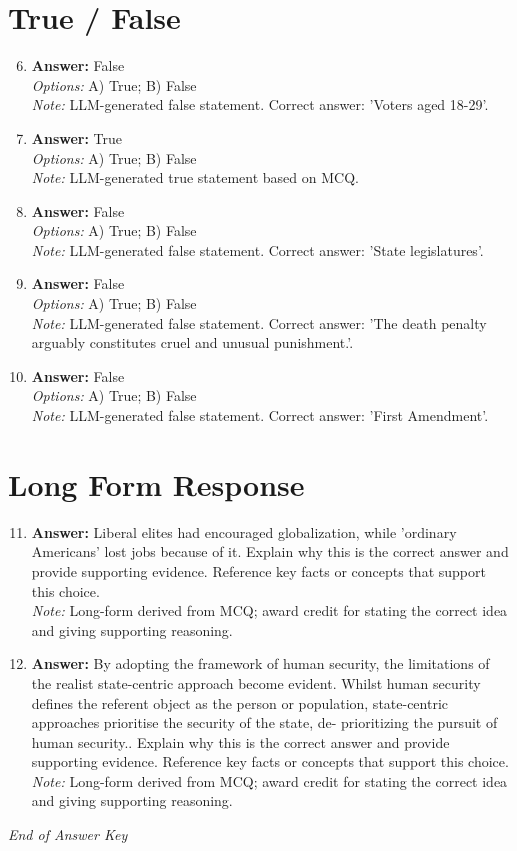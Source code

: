 \documentclass[12pt]{article}
\begin{document}
\section*{True / False}
\begin{enumerate}[label=\arabic*.]
\setcounter{enumi}{5}
\item \textbf{Answer:} False
\\ \textit{Options:} A) True; B) False
\\ \textit{Note:} LLM-generated false statement. Correct answer: 'Voters aged 18-29'.
\item \textbf{Answer:} True
\\ \textit{Options:} A) True; B) False
\\ \textit{Note:} LLM-generated true statement based on MCQ.
\item \textbf{Answer:} False
\\ \textit{Options:} A) True; B) False
\\ \textit{Note:} LLM-generated false statement. Correct answer: 'State legislatures'.
\item \textbf{Answer:} False
\\ \textit{Options:} A) True; B) False
\\ \textit{Note:} LLM-generated false statement. Correct answer: 'The death penalty arguably constitutes cruel and unusual punishment.'.
\item \textbf{Answer:} False
\\ \textit{Options:} A) True; B) False
\\ \textit{Note:} LLM-generated false statement. Correct answer: 'First Amendment'.
\end{enumerate}

\section*{Long Form Response}
\begin{enumerate}[label=\arabic*.]
\setcounter{enumi}{10}
\item \textbf{Answer:} Liberal elites had encouraged globalization, while 'ordinary Americans' lost jobs because of it. Explain why this is the correct answer and provide supporting evidence. Reference key facts or concepts that support this choice.
\\ \textit{Note:} Long-form derived from MCQ; award credit for stating the correct idea and giving supporting reasoning.
\item \textbf{Answer:} By adopting the framework of human security, the limitations of the realist state-centric approach become evident. Whilst human security defines the referent object as the person or population, state-centric approaches prioritise the security of the state, de- prioritizing the pursuit of human security.. Explain why this is the correct answer and provide supporting evidence. Reference key facts or concepts that support this choice.
\\ \textit{Note:} Long-form derived from MCQ; award credit for stating the correct idea and giving supporting reasoning.
\end{enumerate}

\vfill
\noindent\textit{End of Answer Key}
\end{document}
